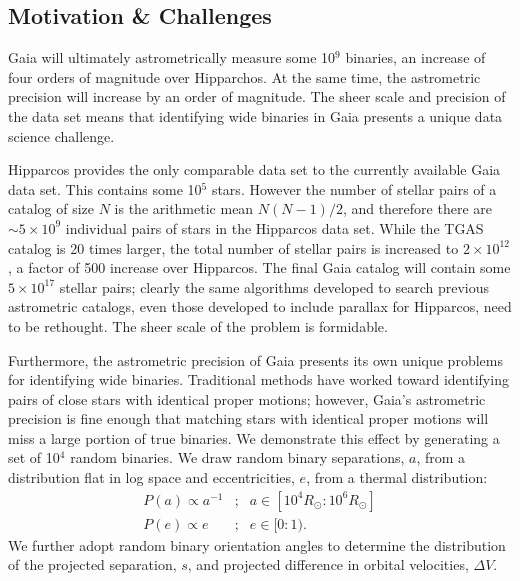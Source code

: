 \documentclass[usenatbib]{mnras}
\begin{document}




\subsection{Motivation \& Challenges}
\label{sec:motivation}

Gaia will ultimately astrometrically measure some 10$^9$ binaries, an increase of four orders of magnitude over Hipparchos. At the same time, the astrometric precision will increase by an order of magnitude. The sheer scale and precision of the data set means that identifying wide binaries in Gaia presents a unique data science challenge.


Hipparcos provides the only comparable data set to the currently available Gaia data set. This contains some 10$^5$ stars. However the number of stellar pairs of a catalog of size $N$ is the arithmetic mean $N(N-1)/2$, and therefore there are $\sim5\times10^9$ individual pairs of stars in the Hipparcos data set. While the TGAS catalog is 20 times larger, the total number of stellar pairs is increased to $2\times10^{12}$, a factor of 500 increase over Hipparcos. The final Gaia catalog will contain some $5\times10^{17}$ stellar pairs; clearly the same algorithms developed to search previous astrometric catalogs, even those developed to include parallax for Hipparcos, need to be rethought. The sheer scale of the problem is formidable.


Furthermore, the astrometric precision of Gaia presents its own unique problems for identifying wide binaries. Traditional methods have worked toward identifying pairs of close stars with identical proper motions; however, Gaia's astrometric precision is fine enough that matching stars with identical proper motions will miss a large portion of true binaries. We demonstrate this effect by generating a set of 10$^4$ random binaries. We draw random binary separations, $a$, from a distribution flat in log space and eccentricities, $e$, from a thermal distribution:
\begin{eqnarray}
P(a) \propto a^{-1} &;& a \in [10^4 R_{\odot}:10^6 R_{\odot}] \\
P(e) \propto e\ \ \ &;& e \in [0:1).
\end{eqnarray}
We further adopt random binary orientation angles to determine the distribution of the projected separation, $s$, and projected difference in orbital velocities, $\Delta V$. 
\end{document}
